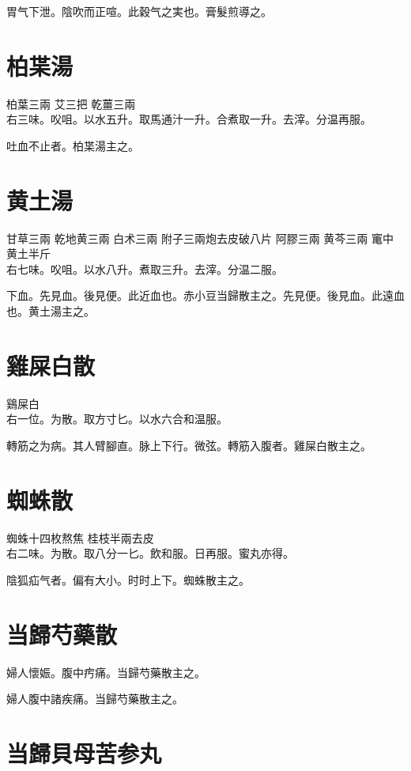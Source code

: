 胃气下泄。陰吹而正喧。此穀气之実也。膏髮煎導之。

\section{柏枼湯}

柏葉{\scriptsize 三兩} 艾{\scriptsize 三把} 乾薑{\scriptsize 三兩}\\
右三味。㕮咀。以水五升。取馬通汁一升。合煮取一升。去滓。分温再服。

吐血不止者。柏枼湯主之。

\section{黄土湯}

甘草{\scriptsize 三兩} 乾地黄{\scriptsize 三兩} 白术{\scriptsize 三兩} 附子{\scriptsize 三兩炮去皮破八片} 阿膠{\scriptsize 三兩} 黄芩{\scriptsize 三兩} 竃中黄土{\scriptsize 半斤}\\
右七味。㕮咀。以水八升。煮取三升。去滓。分温二服。

下血。先見血。後見便。此近血也。赤小豆当歸散主之。先見便。後見血。此遠血也。黄土湯主之。

\section{雞屎白散}

鷄屎白\\
右一位。为散。取方寸匕。以水六合和温服。

轉筋之为病。其人臂腳直。脉上下行。微弦。轉筋入腹者。雞屎白散主之。

\section{蜘蛛散}

蜘蛛{\scriptsize 十四枚熬焦} 桂枝{\scriptsize 半兩去皮}\\
右二味。为散。取八分一匕。飲和服。日再服。蜜丸亦得。

陰狐疝气者。偏有大小。时时上下。蜘蛛散主之。

\section{当歸芍藥散}

婦人懷娠。腹中㽲痛。当歸芍藥散主之。

婦人腹中諸疾痛。当歸芍藥散主之。

\section{当歸貝母苦参丸}

